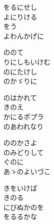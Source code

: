 \documentclass[10pt,b5j]{tarticle} %
\begin{document}
\vspace{1.5em} %
\newcommand{\linespace}{0.5em} %
\newcommand{\blocksize}{0.5\hsize} %
\begin{enumerate} %
    \begin{minipage}[c]{\blocksize}
    
        \vspace{\linespace}
        \item
        をるにせし\\
        よにりける\\
        をう\\
        よわんかげに
        
        \vspace{\linespace}
        \item
        ののて\\
        りにしもいけむ\\
        のにたけし\\
        のかゞりに
        
        \vspace{\linespace}
        \item
        のはかれて\\
        きのえ\\
        かにるポプラ\\
        のあわれなり
        
        \vspace{\linespace}
        \item
        ののかさよ\\
        のみどりして\\
        ぐのに\\
        あゝのよいづこ
        
        \vspace{\linespace}
        \item
        きをいけば\\
        きのる\\
        にびぬかのを\\
        をるるかな
        

\end{minipage}
\end{enumerate}
\end{document}
